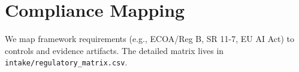 
\section{Compliance Mapping}
We map framework requirements (e.g., ECOA/Reg B, SR 11-7, EU AI Act) to controls and evidence artifacts. The detailed matrix lives in \texttt{intake/regulatory\_matrix.csv}.
